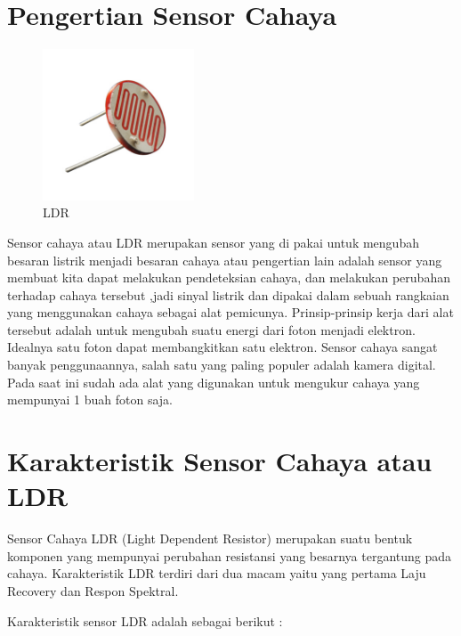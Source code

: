 \documentclass{article}
\begin{document}

\section{Pengertian Sensor Cahaya}

\begin{figure}[ht]
	\centerline{\includegraphics[width=0.4\textwidth]{figures/LDR.jpg}}
	\caption{LDR}
	\label{LDR}
\end{figure}

Sensor cahaya atau LDR merupakan sensor yang di pakai untuk mengubah besaran listrik menjadi besaran cahaya atau pengertian lain adalah  sensor yang membuat kita dapat melakukan pendeteksian cahaya, dan melakukan perubahan terhadap cahaya tersebut ,jadi sinyal listrik dan dipakai dalam sebuah rangkaian yang menggunakan cahaya sebagai alat pemicunya. Prinsip-prinsip kerja dari alat tersebut adalah untuk mengubah suatu energi dari foton menjadi elektron. Idealnya satu foton dapat membangkitkan satu elektron. Sensor cahaya sangat banyak penggunaannya, salah satu yang paling populer adalah kamera digital. Pada saat ini sudah ada alat yang digunakan untuk mengukur cahaya yang mempunyai 1 buah foton saja.

\section{Karakteristik Sensor Cahaya atau LDR}

Sensor Cahaya LDR (Light Dependent Resistor) merupakan suatu bentuk komponen yang mempunyai perubahan resistansi yang besarnya tergantung pada cahaya. Karakteristik LDR terdiri dari dua macam yaitu yang pertama Laju Recovery dan Respon Spektral.

Karakteristik sensor LDR adalah sebagai berikut :
\end{document}
